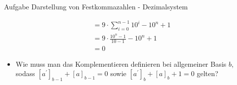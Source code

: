 \begin{frame}[allowframebreaks]{Aufgabe \thesection}{Darstellung von Festkommazahlen - Dezimalsystem}
\begin{solution}
\begin{itemize}
\begin{align*}
            &=9\cdot\sum_{i=0}^{n-1}10^{i}-10^{n}+1\\
            &=9\cdot\frac{10^{n}-1}{10-1}-10^{n}+1\\
            &=0
        \end{align*}
    \end{itemize}
  \end{solution}
  \begin{exercisenoinc} %
    \begin{itemize}
        \item Wie muss man das Komplementieren definieren bei allgemeiner Basis $b$, sodass $[a^{\prime}]_{b-1}+[a]_{b-1} = 0$ sowie $[a^{\prime}]_{b}+[a]_{b} + 1 = 0$ gelten?
    \end{itemize}
  \end{exercisenoinc}
  \if{}\fi
\end{frame}
